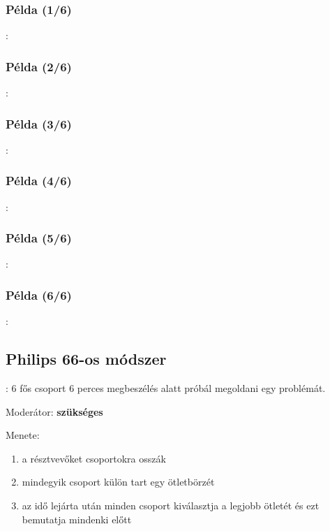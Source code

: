 \documentclass{beamer}
\begin{document}
\subsubsection*{Példa (1/6)}
\begin{frame}{\subsecname : \subsubsecname}
    
\end{frame}

\subsubsection*{Példa (2/6)}
\begin{frame}{\subsecname : \subsubsecname}
    
\end{frame}

\subsubsection*{Példa (3/6)}
\begin{frame}{\subsecname : \subsubsecname}
    
\end{frame}

\subsubsection*{Példa (4/6)}
\begin{frame}{\subsecname : \subsubsecname}
    
\end{frame}

\subsubsection*{Példa (5/6)}
\begin{frame}{\subsecname : \subsubsecname}
    
\end{frame}

\subsubsection*{Példa (6/6)}
\begin{frame}{\subsecname : \subsubsecname}
    
\end{frame}

\subsection{Philips 66-os módszer}
\begin{frame}{\secname : \subsecname}
6 fős csoport 6 perces megbeszélés alatt próbál megoldani egy problémát.

Moderátor: \textbf{szükséges}

Menete:
\begin{enumerate}
    \item a résztvevőket csoportokra osszák
    \item mindegyik csoport külön tart egy ötletbörzét
    \item az idő lejárta után minden csoport kiválasztja a legjobb ötletét és ezt bemutatja mindenki előtt
\end{enumerate}
\end{frame}
\end{document}
